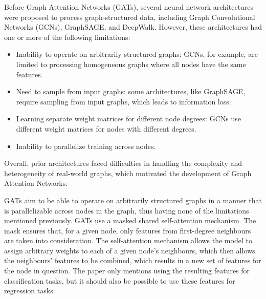 Before Graph Attention Networks (GATs), several neural network architectures were proposed to process graph-structured data, including Graph Convolutional Networks (GCNs), GraphSAGE, and DeepWalk. However, these architectures had one or more of the following limitations:

\begin{itemize}
    \item Inability to operate on arbitrarily structured graphs: GCNs, for example, are limited to processing homogeneous graphs where all nodes have the same features.

    \item Need to sample from input graphs: some architectures, like GraphSAGE, require sampling from input graphs, which leads to information loss.

    \item Learning separate weight matrices for different node degrees: GCNs use different weight matrices for nodes with different degrees.

    \item Inability to parallelize training across nodes.
\end{itemize}

Overall, prior architectures faced difficulties in handling the complexity and heterogeneity of real-world graphs, which motivated the development of Graph Attention Networks.

GATs aim to be able to operate on arbitrarily structured graphs in a manner that is parallelizable across nodes in the graph, thus having none of the
limitations mentioned previously.
GATs use a masked shared self-attention mechanism.
The mask ensures that, for a given node, only features from first-degree neighbours are taken into consideration.
The self-attention mechanism allows the model to assign arbitrary weights to each of a given
node's neighbours, which then allows the neighbours' features to be
combined, which results in a new set of features for the node in question.
The paper only mentions using the resulting features for classification
tasks, but it should also be possible to use these features for regression
tasks.

